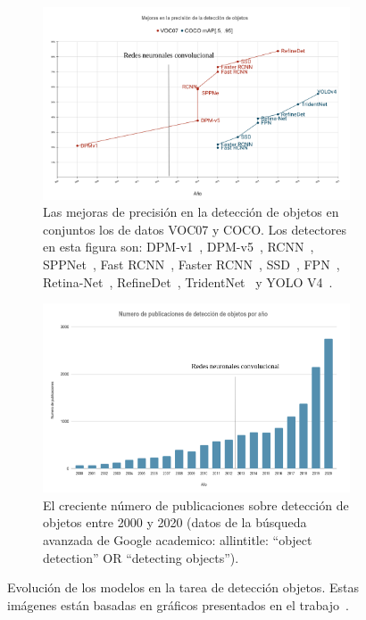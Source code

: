 \begin{figure}[]
	\centering
	\begin{subfigure}{0.75\textwidth}
		\centering
		\includegraphics[width=1\textwidth]{img/evolucion_2.png}
		\caption{Las mejoras de precisión en la detección de objetos en conjuntos los de datos VOC07 y COCO. Los detectores en esta figura son: DPM-v1~\cite{felzenszwalb2008discriminatively}, DPM-v5~\cite{sadeghi201430hz}, RCNN~\cite{girshick2014rich}, SPPNet~\cite{girshick2014rich}, Fast RCNN~\cite{he2015spatial}, Faster RCNN~\cite{ren2015faster}, SSD~\cite{liu2016ssd}, FPN~\cite{lin2017feature}, Retina-Net~\cite{lin2017focal}, RefineDet~\cite{zhang2018single}, TridentNet~\cite{li2019scale} y YOLO V4~\cite{wang2020scaled}.}
		\label{fig:IoU}
	\end{subfigure}
	\centering
	\begin{subfigure}{0.75\textwidth}
		\centering
		\includegraphics[width=1\textwidth]{img/evolucion_1.png}
		\caption{El creciente número de publicaciones sobre detección de objetos entre 2000 y 2020 (datos de la búsqueda avanzada de Google academico: allintitle: ``object detection'' OR ``detecting objects'').}
		\label{fig:NMS}
	\end{subfigure}
	\caption{Evolución de los modelos en la tarea de detección objetos. Estas imágenes están basadas en gráficos presentados en el trabajo~\cite{zou2019object}.}
	\label{fig:evolucion}
\end{figure}

